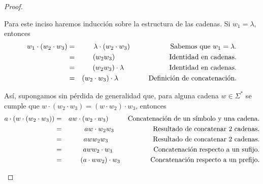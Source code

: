 \documentclass{article}
\begin{document}
\begin{enumerate}
\begin{proof}
\begin{enumerate}
      Para este inciso haremos inducción sobre la estructura de las cadenas. Si $w_1 = \lambda$,
      entonces
      \begin{eqnarray*}
        w_1 \cdot  (w_2 \cdot w_3) &=& \lambda \cdot (w_2 \cdot w_3)
        \hspace*{2cm} \text{Sabemos que } w_1 = \lambda.\\
        &=& (w_2 w_3)
        \hspace{2.7cm} \text{Identidad en cadenas.}\\
        &=& (w_2 w_3) \cdot \lambda
        \hspace*{2.25cm} \text{Identidad en cadenas.}\\
        &=& (w_2 \cdot w_3) \cdot \lambda
        \hspace*{1.5cm} \text{Definición de concatenación.}
      \end{eqnarray*}
      \begin{center}
      \end{center}
      Así, supongamos sin pérdida de generalidad que, para alguna cadena $w \in \Sigma^{*}$
      se cumple que $w\cdot (w_{2} \cdot w_{3}) = (w \cdot w_{2}) \cdot w_{3}$, entonces
      \begin{eqnarray*}
        a \cdot \left(w \cdot (w_{2} \cdot w_{3}) \right) &=&  aw \cdot (w_{2} \cdot w_{3})
        \hspace*{1cm} \text{Concatenación de un símbolo y una cadena.}\\
        &=& aw \cdot w_2 w_3
        \hspace*{2cm} \text{Resultado de concatenar $2$ cadenas.}\\
        &=& aw w_2 w_3
        \hspace*{2.3cm} \text{Resultado de concatenar $2$ cadenas.}\\
        &=& aw w_2 \cdot w_3
        \hspace*{2.1cm} \text{Concatenación respecto a un sufijo.}\\
        &=& (a \cdot ww_2) \cdot w_3
        \hspace*{1.55cm} \text{Concatenación respecto a un prefijo.}\\

\end{eqnarray*}
\end{enumerate}
\end{proof}
\end{enumerate}
\end{document}
